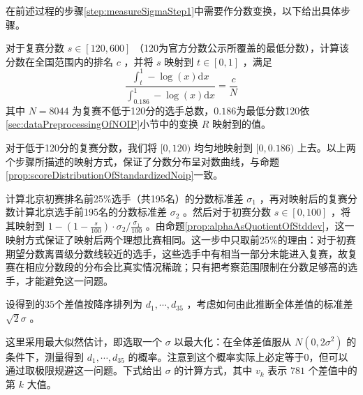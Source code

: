             在前述过程的步骤\ref{step:measureSigmaStep1}中需要作分数变换，以下给出具体步骤。
            \begin{asparaenum}[\bfseries{步骤} 1.]
                \item 对于复赛分数 $s\in [120,600]$ （120为官方分数公示所覆盖的最低分数），计算该分数在全国范围内的排名 $c$ ，并将 $s$ 映射到 $t\in [0,1]$ ，满足 $$\frac{\int_t^1 -\log(x)\mathrm{d}x}{\int_{0.186}^1 -\log(x)\mathrm{d}x}=\frac cN$$ 其中 $N=8044$ 为复赛不低于120分的选手总数，$0.186$为最低分数120依\ref{sec:dataPreprocessingOfNOIP}小节中的变换 $R$ 映射到的值。
                \item 对于低于120分的复赛分数，我们将 $[0,120)$ 均匀地映射到 $[0,0.186)$ 上去。以上两个步骤所描述的映射方式，保证了分数分布呈对数曲线，与命题\ref{prop:scoreDistributionOfStandardizedNoip}一致。
                \item 计算北京初赛排名前25\%选手（共195名）的分数标准差 $\sigma_1$ ，再对映射后的复赛分数计算北京选手前195名的分数标准差 $\sigma_2$ 。然后对于初赛分数 $s\in [0,100]$ ，将其映射到 $1-(1-\frac {s}{100})\cdot\sigma_2/\frac{\sigma_1}{100}$ 。由命题\ref{prop:alphaAsQuotientOfStddev}，这一映射方式保证了映射后两个理想比赛相同。这一步中只取前25\%的理由：对于初赛期望分数离晋级分数线较近的选手，这些选手中有相当一部分未能进入复赛，故复赛在相应分数段的分布会比真实情况稀疏；只有把考察范围限制在分数足够高的选手，才能避免这一问题。
            \end{asparaenum}

            \vspace{1.5ex}

            设得到的35个差值按降序排列为 $d_1,\cdots,d_{35}$ ，考虑如何由此推断全体差值的标准差 $\sqrt{2}\sigma$ 。
            
            这里采用最大似然估计，即选取一个 $\sigma$ 以最大化：在全体差值服从 $N(0,2\sigma^2)$ 的条件下，测量得到 $d_1,\cdots,d_{35}$ 的概率。注意到这个概率实际上必定等于0，但可以通过取极限规避这一问题。下式给出 $\sigma$ 的计算方式，其中 $v_{k}$ 表示 $781$ 个差值中的第 $k$ 大值。

